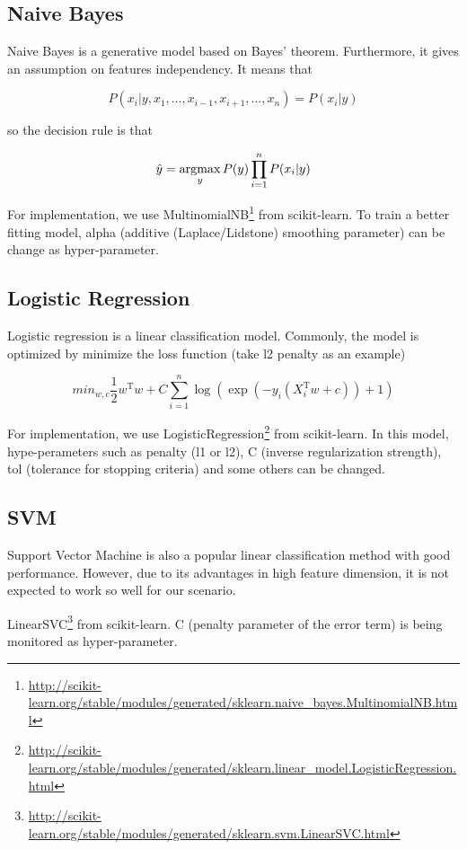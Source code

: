 \documentclass{article}
\begin{document}
\subsection{Naive Bayes}

Naive Bayes is a generative model based on Bayes’ theorem. Furthermore, it gives an assumption on features independency. It means that

$$
P(x_i|y,x_1,\dots,x_{i-1},x_{i+1},\dots,x_n)=P(x_i|y)
$$

so the decision rule is that

\newcommand{\argmax}{\operatornamewithlimits{argmax}}
$$
\hat{y}=\argmax_yP(y)\prod_{i=1}^nP(x_i|y)
$$

For implementation, we use MultinomialNB\footnote{\url{http://scikit-learn.org/stable/modules/generated/sklearn.naive_bayes.MultinomialNB.html}} from scikit-learn. To train a better fitting model, alpha (additive (Laplace/Lidstone) smoothing parameter) can be change as hyper-parameter.

\subsection{Logistic Regression}

Logistic regression is a linear classification model. Commonly, the model is optimized by minimize the loss function (take l2 penalty as an example)

$$
min_{w,c}\frac{1}{2}w^\mathrm{T}w+C\sum_{i=1}^n\log(\exp(-y_i(X_i^\mathrm{T}w+c))+1)
$$

For implementation, we use LogisticRegression\footnote{\url{http://scikit-learn.org/stable/modules/generated/sklearn.linear_model.LogisticRegression.html}} from scikit-learn. In this model, hype-perameters such as penalty (l1 or l2), C (inverse regularization strength), tol (tolerance for stopping criteria) and some others can be changed.

\subsection{SVM}

Support Vector Machine is also a popular linear classification method with good performance. However, due to its advantages in high feature dimension, it is not expected to work so well for our scenario.

LinearSVC\footnote{\url{http://scikit-learn.org/stable/modules/generated/sklearn.svm.LinearSVC.html}} from scikit-learn. C (penalty parameter of the error term) is being monitored as hyper-parameter.
\end{document}
